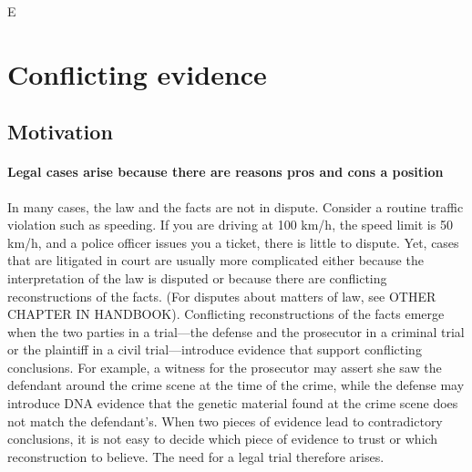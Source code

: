 \documentclass[10pt]{article}
\begin{document}
		E
			


\section{Conflicting evidence}


\subsection{Motivation}
 	
\paragraph{Legal cases arise because there are reasons pros and cons a position} 


In many cases, the law and the facts are not in dispute. Consider a routine traffic violation such as speeding. 
If you are driving at 100 km/h, the speed limit is 50 km/h, and a police officer issues you a ticket, 
there is  little to dispute. Yet, cases that are litigated in court are usually more complicated either because the interpretation of 
the law is disputed or because there are conflicting reconstructions of the facts. 
(For disputes about matters of law, see OTHER CHAPTER IN HANDBOOK).
Conflicting reconstructions of the facts emerge when the two parties in a trial---the defense and the prosecutor in a criminal trial or 
the plaintiff in a civil trial---introduce evidence that support conflicting conclusions. 
For example, a witness for the prosecutor may assert she saw the defendant around the crime scene at the time of the crime, 
while the defense may introduce DNA evidence that the genetic material found at the crime scene does not match the defendant's.
When two pieces of evidence lead to contradictory conclusions, it is not easy 
to decide which piece of evidence to trust or which reconstruction to believe. The need for a legal trial therefore arises. 
\end{document}
